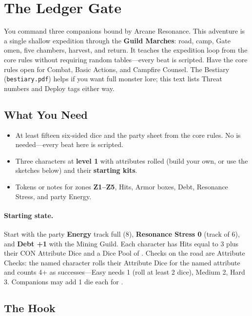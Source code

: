 \section{The Ledger Gate}

You command three companions bound by Arcane Resonance.
This adventure is a single shallow expedition through the \textbf{Guild Marches}: road, camp, Gate omen, five chambers, harvest, and return.
It teaches the expedition loop from the core rules without requiring random tables---every beat is scripted.
Have the core rules open for Combat, Basic Actions, and Campfire Counsel.
The Bestiary (\texttt{bestiary.pdf}) helps if you want full monster lore; this text lists Threat numbers and Deploy tags either way.

\subsection{What You Need}

\begin{itemize}
    \item At least fifteen six-sided dice and the party sheet from the core rules. No \dper{} is needed---every beat here is scripted.
    \item Three characters at \textbf{level 1} with attributes rolled (build your own, or use the sketches below) and their \textbf{starting kits}.
    \item Tokens or notes for zones \textbf{Z1--Z5}, Hits, Armor boxes, Debt, Resonance Stress, and party Energy.
\end{itemize}

\paragraph{Starting state.}
Start with the party \textbf{Energy} track full (8), \textbf{Resonance Stress 0} (track of 6), and \textbf{Debt +1} with the Mining Guild.
Each character has Hits equal to 3 plus their CON Attribute Dice and a Dice Pool of .
Checks on the road are Attribute Checks: the named character rolls their Attribute Dice for the named attribute and counts 4+ as successes---Easy needs 1 (roll at least 2 dice), Medium 2, Hard 3. Companions may add 1 die each for .

\subsection{The Hook}

